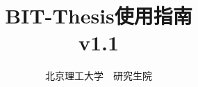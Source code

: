 \documentclass[oneside, master]{BIT-thesis-grd}
\begin{document}

\title{BIT-Thesis使用指南\\ v1.1}
\author{北京理工大学~~研究生院}

\maketitle

\frontmatter

\tableofcontents

% 

\mainmatter  %







%


\appendix




\backmatter 

%

\end{document}
